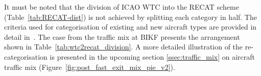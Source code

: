 \begin{table}[h]
\centering
{}
\caption[ICAO wake turbulence categories and separation minima]{ICAO wake turbulence categories and separation minima to avoid wake vortex encounter~\cite{noauthor_recat_2018, rooseleer2015recat}.} \label{tab:ICAO_WTC}
\end{table}

It must be noted that the division of ICAO WTC into the RECAT scheme (Table~\ref{tab:RECAT-dist}) is not achieved by splitting each category in half.
The criteria used for categorisation of existing and new aircraft types are provided in detail in~\cite{rooseleer2015recat}. The case from the traffic mix at BIKF presents the arrangement shown in Table~\ref{tab:wtc2recat_division}. A more detailed illustration of the re-categorisation is presented in the upcoming section \ref{ssec:traffic_mix} on aircraft traffic mix (Figure~\ref{fig:post_fast_exit_mix_pie_v2}).

